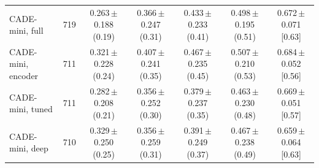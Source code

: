 \begin{table}[t]
{\begin{tabular}{@{}lrccccc@{}}
    \midrule
    CADE-mini, full & 719 & 0.263\,{\scriptsize$\pm$0.188} {\scriptsize(0.19)} & 0.366\,{\scriptsize$\pm$0.247} {\scriptsize(0.31)} & 0.433\,{\scriptsize$\pm$0.233} {\scriptsize(0.41)} & 0.498\,{\scriptsize$\pm$0.195} {\scriptsize(0.51)} & 0.672\,{\scriptsize$\pm$0.071} {\scriptsize[0.63]} \\
    CADE-mini, encoder & 711 & 0.321\,{\scriptsize$\pm$0.228} {\scriptsize(0.24)} & 0.407\,{\scriptsize$\pm$0.241} {\scriptsize(0.35)} & 0.467\,{\scriptsize$\pm$0.235} {\scriptsize(0.45)} & 0.507\,{\scriptsize$\pm$0.210} {\scriptsize(0.53)} & 0.684\,{\scriptsize$\pm$0.052} {\scriptsize[0.56]} \\
    CADE-mini, tuned & 711 & 0.282\,{\scriptsize$\pm$0.208} {\scriptsize(0.21)} & 0.356\,{\scriptsize$\pm$0.252} {\scriptsize(0.30)} & 0.379\,{\scriptsize$\pm$0.237} {\scriptsize(0.35)} & 0.463\,{\scriptsize$\pm$0.230} {\scriptsize(0.48)} & 0.669\,{\scriptsize$\pm$0.051} {\scriptsize[0.57]} \\
    CADE-mini, deep & 710 & 0.329\,{\scriptsize$\pm$0.250} {\scriptsize(0.25)} & 0.356\,{\scriptsize$\pm$0.259} {\scriptsize(0.31)} & 0.391\,{\scriptsize$\pm$0.249} {\scriptsize(0.37)} & 0.467\,{\scriptsize$\pm$0.238} {\scriptsize(0.49)} & 0.659\,{\scriptsize$\pm$0.064} {\scriptsize[0.63]} \\
    \bottomrule
  \end{tabular}}
\end{table}
